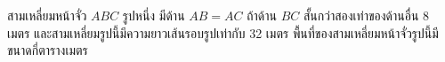 ﻿%
\question สามเหลี่ยมหน้าจั่ว $ABC$ รูปหนึ่ง มีด้าน $AB=AC$ ถ้าด้าน $BC$ สั้นกว่าสองเท่าของด้านอื่น 8 เมตร และสามเหลี่ยมรูปนี้มีความยาวเส้นรอบรูปเท่ากับ 32 เมตร พื้นที่ของสามเหลี่ยมหน้าจั่วรูปนี้มีขนาดกี่ตารางเมตร
\newline
{}
